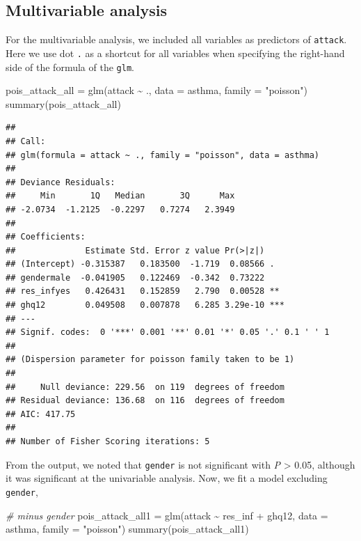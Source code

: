 \documentclass[
  10pt,
]{krantz}
\newenvironment{Shaded}{\begin{snugshade}}{\end{snugshade}}
\newcommand{\AttributeTok}[1]{\textcolor[rgb]{0.77,0.63,0.00}{#1}}
\newcommand{\CommentTok}[1]{\textcolor[rgb]{0.56,0.35,0.01}{\textit{#1}}}
\newcommand{\FunctionTok}[1]{\textcolor[rgb]{0.00,0.00,0.00}{#1}}
\newcommand{\NormalTok}[1]{#1}
\newcommand{\OtherTok}[1]{\textcolor[rgb]{0.56,0.35,0.01}{#1}}
\newcommand{\SpecialCharTok}[1]{\textcolor[rgb]{0.00,0.00,0.00}{#1}}
\newcommand{\StringTok}[1]{\textcolor[rgb]{0.31,0.60,0.02}{#1}}
\begin{document}
\hypertarget{multivariable-analysis-1}{%
\subsection{Multivariable analysis}\label{multivariable-analysis-1}}

For the multivariable analysis, we included all variables as predictors of \texttt{attack}. Here we use dot \texttt{.} as a shortcut for all variables when specifying the right-hand side of the formula of the \texttt{glm}.

\begin{Shaded}
\begin{Highlighting}[]
\NormalTok{pois\_attack\_all }\OtherTok{=} \FunctionTok{glm}\NormalTok{(attack }\SpecialCharTok{\textasciitilde{}}\NormalTok{ ., }\AttributeTok{data =}\NormalTok{ asthma, }\AttributeTok{family =} \StringTok{"poisson"}\NormalTok{)}
\FunctionTok{summary}\NormalTok{(pois\_attack\_all)}
\end{Highlighting}
\end{Shaded}

\begin{verbatim}
## 
## Call:
## glm(formula = attack ~ ., family = "poisson", data = asthma)
## 
## Deviance Residuals: 
##     Min       1Q   Median       3Q      Max  
## -2.0734  -1.2125  -0.2297   0.7274   2.3949  
## 
## Coefficients:
##              Estimate Std. Error z value Pr(>|z|)    
## (Intercept) -0.315387   0.183500  -1.719  0.08566 .  
## gendermale  -0.041905   0.122469  -0.342  0.73222    
## res_infyes   0.426431   0.152859   2.790  0.00528 ** 
## ghq12        0.049508   0.007878   6.285 3.29e-10 ***
## ---
## Signif. codes:  0 '***' 0.001 '**' 0.01 '*' 0.05 '.' 0.1 ' ' 1
## 
## (Dispersion parameter for poisson family taken to be 1)
## 
##     Null deviance: 229.56  on 119  degrees of freedom
## Residual deviance: 136.68  on 116  degrees of freedom
## AIC: 417.75
## 
## Number of Fisher Scoring iterations: 5
\end{verbatim}

From the output, we noted that \texttt{gender} is not significant with \emph{P} \textgreater{} 0.05, although it was significant at the univariable analysis. Now, we fit a model excluding \texttt{gender},

\begin{Shaded}
\begin{Highlighting}[]
\CommentTok{\# minus gender}
\NormalTok{pois\_attack\_all1 }\OtherTok{=} \FunctionTok{glm}\NormalTok{(attack }\SpecialCharTok{\textasciitilde{}}\NormalTok{ res\_inf }\SpecialCharTok{+}\NormalTok{ ghq12, }\AttributeTok{data =}\NormalTok{ asthma, }
                       \AttributeTok{family =} \StringTok{"poisson"}\NormalTok{)}
\FunctionTok{summary}\NormalTok{(pois\_attack\_all1)}
\end{Highlighting}
\end{Shaded}
\end{document}
